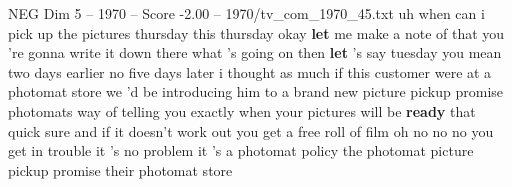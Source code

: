 \begin{textsample}{NEG Dim 5 – 1970 – Score -2.00 – 1970/tv\_com\_1970\_45.txt}  \label{ex:f5_neg_057}
uh when can i pick up the pictures thursday this thursday okay \textbf{let} me make a note of that you 're gonna write it down there what 's going on then \textbf{let} 's say tuesday you mean two days earlier no five days later i thought as much if this customer were at a photomat store we 'd be introducing him to a brand new picture pickup promise photomats way of telling you exactly when your pictures will be \textbf{ready} that quick sure and if it doesn't work out you get a free roll of film oh no no no you get in trouble it 's no problem it 's a photomat policy the photomat picture pickup promise their photomat store

\end{textsample}
